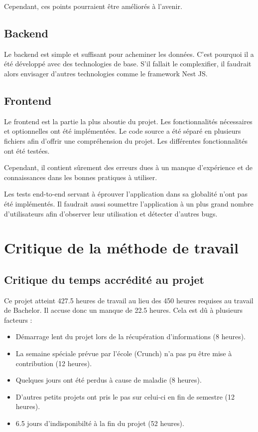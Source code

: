 \documentclass[
    iai, %
    il, %
]{heig-tb}
\begin{document}
Cependant, ces points pourraient être améliorés à l'avenir.

\subsection{Backend}
Le backend est simple et suffisant pour acheminer les données.
C'est pourquoi il a été développé avec des technologies de base.
S'il fallait le complexifier, il faudrait alors envisager d'autres technologies comme le framework Nest JS.

\subsection{Frontend}
Le frontend est la partie la plus aboutie du projet.
Les fonctionnalités nécessaires et optionnelles ont été implémentées.
Le code source a été séparé en plusieurs fichiers afin d'offrir une compréhension du projet.
Les différentes fonctionnalités ont été testées.

Cependant, il contient sûrement des erreurs dues à un manque d'expérience et de connaissances dans les bonnes pratiques à utiliser.

Les tests end-to-end servant à éprouver l'application dans sa globalité n'ont pas été implémentés.
Il faudrait aussi soumettre l'application à un plus grand nombre d'utilisateurs afin d'observer leur utilisation et détecter d'autres bugs.

\section{Critique de la méthode de travail}

\subsection{Critique du temps accrédité au projet}
Ce projet atteint 427.5 heures de travail au lieu des 450 heures requises au travail de Bachelor. Il accuse donc un manque de 22.5 heures.
Cela est dû à plusieurs facteurs :

\begin{itemize}
    \item Démarrage lent du projet lors de la récupération d'informations (8 heures).
    \item La semaine spéciale prévue par l'école (Crunch) n'a pas pu être mise à contribution (12 heures).
    \item Quelques jours ont été perdus à cause de maladie (8 heures).
    \item D'autres petits projets ont pris le pas sur celui-ci en fin de semestre (12 heures).
    \item 6.5 jours d'indisponibilté à la fin du projet (52 heures).
\end{itemize}
\end{document}
